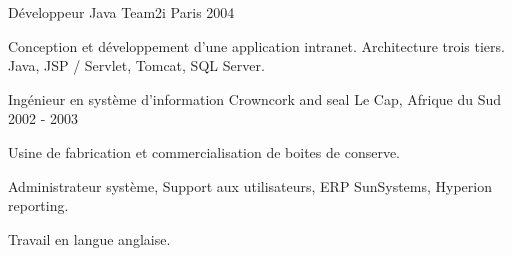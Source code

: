 \begin{cventries}
  \cventry
    {Développeur Java} %
    {Team2i} %
    {Paris} %
    {2004} %
    {
      \begin{cvitems} %
        \item {Conception et développement d’une application intranet. Architecture trois tiers. Java, JSP / Servlet, Tomcat, SQL Server.}
      \end{cvitems}
    }

  \cventry
    {Ingénieur en système d'information} %
    {Crowncork and seal} %
    {Le Cap, Afrique du Sud} %
    {2002 - 2003} %
    {
      \begin{cvitems} %
        \item {Usine de fabrication et commercialisation de boites de conserve.}
        \item {Administrateur système, Support aux utilisateurs, ERP SunSystems, Hyperion reporting.}
        \item {Travail en langue anglaise.}
      \end{cvitems}
    }

\end{cventries}
